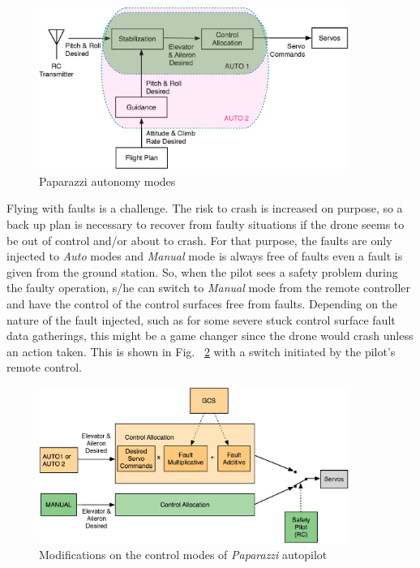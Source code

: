 \begin{figure}[h]
\begin{center}
\includegraphics[width=0.9\textwidth]{figures/pprzControlModes}    %
\caption{Paparazzi autonomy modes} 
\label{fig:paparazziControlModes}
\end{center}
\end{figure}

Flying with faults is a challenge. 
The risk to crash is increased on purpose, so a back up plan is necessary to recover from faulty situations if the drone seems to be out of control and/or about to crash. 
For that purpose, the faults are only injected to \emph{Auto} modes and \emph{Manual} mode is always free of faults even a fault is given from the ground station. 
So, when the pilot sees a safety problem during the faulty operation, s/he can switch to \emph{Manual} mode from the remote controller and have the control of the control surfaces free from faults. 
Depending on the nature of the fault injected, such as for some severe stuck control surface fault data gatherings, this might be a game changer since the drone would crash unless an action taken.  
This is shown in Fig. ~\ref{fig:faultInjectionPaparazzi} with a switch initiated by the pilot's remote control. 

\begin{figure}[h]
\begin{center}
\includegraphics[width=0.9\textwidth]{figures/faultInjectionPprz}    %
\caption{Modifications on the control modes of \emph{Paparazzi} autopilot} 
\label{fig:faultInjectionPaparazzi}
\end{center}
\end{figure}

